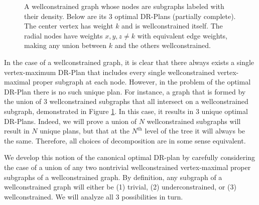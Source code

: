 \documentclass[11pt]{article}
\newcommand{\tedge}[5]{\draw[#3] (#1)-- node[e, #5] (e#4) {#4} (#2)}
\begin{document}
\begin{figure}
\begin{center}


\end{center}

\caption{A wellconstrained graph whose nodes are subgraphs labeled with their density. Below are its 3 optimal DR-Plans (partially complete). The center vertex has weight $k$ and is wellconstrained itself. The radial nodes have weights $x,y,z \neq k$ with equivalent edge weights, making any union between $k$ and the others wellconstrained.}
\label{3-plans}
\end{figure}

In the case of a wellconstrained graph, it is clear that there always exists a single vertex-maximum DR-Plan that includes every single wellconstrained vertex-maximal proper subgraph at each node. However, in the problem of the optimal DR-Plan there is no such unique plan. For instance, a graph that is formed by the union of 3 wellconstrained subgraphs that all intersect on a wellconstrained subgraph, demonstrated in Figure \ref{3-plans}. In this case, it results in $3$ unique optimal DR-Plans. Indeed, we will prove a union of $N$ wellconstrained subgraphs will result in $N$ unique plans, but that at the $N^{\text{th}}$ level of the tree it will always be the same. Therefore, all choices of decomposition are in some sense equivalent.

We develop this notion of the canonical optimal DR-plan by carefully considering the case of a union of any two nontrivial wellconstrained vertex-maximal proper subgraphs of a wellconstrained graph. By definition, any subgraph of a wellconstrained graph will either be (1) trivial, (2) underconstrained, or (3) wellconstrained. We will analyze all 3 possibilities in turn.
\end{document}
